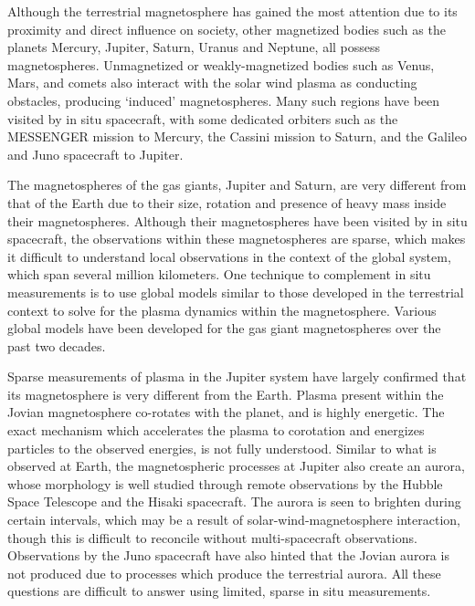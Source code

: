 Although the terrestrial magnetosphere has gained the most attention due to its proximity and direct influence on society, other magnetized bodies such as the planets Mercury, Jupiter, Saturn, Uranus and Neptune, all possess magnetospheres. Unmagnetized or weakly-magnetized bodies such as Venus, Mars, and comets also interact with the solar wind plasma as conducting obstacles, producing `induced' magnetospheres. Many such regions have been visited by in situ spacecraft, with some dedicated orbiters such as the MESSENGER mission to Mercury, the Cassini mission to Saturn, and the Galileo and Juno spacecraft to Jupiter. 

The magnetospheres of the gas giants, Jupiter and Saturn, are very different from that of the Earth due to their size, rotation and presence of heavy mass inside their magnetospheres. Although their magnetospheres have been visited by in situ spacecraft, the observations within these magnetospheres are sparse, which makes it difficult to understand local observations in the context of the global system, which span several million kilometers. One technique to complement in situ measurements is to use global models similar to those developed in the terrestrial context to solve for the plasma dynamics within the magnetosphere. Various global models have been developed for the gas giant magnetospheres over the past two decades. 

Sparse measurements of plasma in the Jupiter system have largely confirmed that its magnetosphere is very different from the Earth. Plasma present within the Jovian magnetosphere co-rotates with the planet, and is highly energetic. The exact mechanism which accelerates the plasma to corotation and energizes particles to the observed energies, is not fully understood. Similar to what is observed at Earth, the magnetospheric processes at Jupiter also create an aurora, whose morphology is well studied through remote observations by the Hubble Space Telescope and the Hisaki spacecraft. The aurora is seen to brighten during certain intervals, which may be a result of solar-wind-magnetosphere interaction, though this is difficult to reconcile without multi-spacecraft observations. Observations by the Juno spacecraft have also hinted that the Jovian aurora is not produced due to processes which produce the terrestrial aurora. All these questions are difficult to answer using limited, sparse in situ measurements. 

